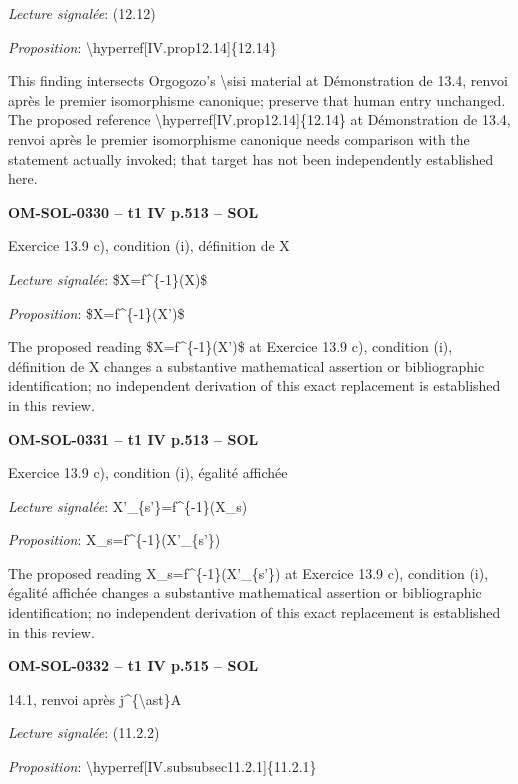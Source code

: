 \emph{Lecture signalée}: (12.12)\par
\emph{Proposition}: \textbackslash{}hyperref[IV.prop12.14]\{12.14\}\par
This finding intersects Orgogozo's \textbackslash{}sisi material at Démonstration de 13.4, renvoi après le premier isomorphisme canonique; preserve that human entry unchanged. The proposed reference \textbackslash{}hyperref[IV.prop12.14]\{12.14\} at Démonstration de 13.4, renvoi après le premier isomorphisme canonique needs comparison with the statement actually invoked; that target has not been independently established here.\par
\par\noindent\textbf{OM-SOL-0330 -- t1 IV p.513 -- SOL}\par
Exercice 13.9 c), condition (i), définition de X\par
\emph{Lecture signalée}: \$X=\allowbreak f\textasciicircum{}\{-1\}(X)\$\par
\emph{Proposition}: \$X=\allowbreak f\textasciicircum{}\{-1\}(X')\$\par
The proposed reading \$X=\allowbreak f\textasciicircum{}\{-1\}(X')\$ at Exercice 13.9 c), condition (i), définition de X changes a substantive mathematical assertion or bibliographic identification; no independent derivation of this exact replacement is established in this review.\par
\par\noindent\textbf{OM-SOL-0331 -- t1 IV p.513 -- SOL}\par
Exercice 13.9 c), condition (i), égalité affichée\par
\emph{Lecture signalée}: X'\_\{s'\}=\allowbreak f\textasciicircum{}\{-1\}(X\_s)\par
\emph{Proposition}: X\_s=\allowbreak f\textasciicircum{}\{-1\}(X'\_\{s'\})\par
The proposed reading X\_s=\allowbreak f\textasciicircum{}\{-1\}(X'\_\{s'\}) at Exercice 13.9 c), condition (i), égalité affichée changes a substantive mathematical assertion or bibliographic identification; no independent derivation of this exact replacement is established in this review.\par
\par\noindent\textbf{OM-SOL-0332 -- t1 IV p.515 -- SOL}\par
14.1, renvoi après j\textasciicircum{}\{\textbackslash{}ast\}A\par
\emph{Lecture signalée}: (11.2.2)\par
\emph{Proposition}: \textbackslash{}hyperref[IV.subsubsec11.2.1]\{11.2.1\}\par

